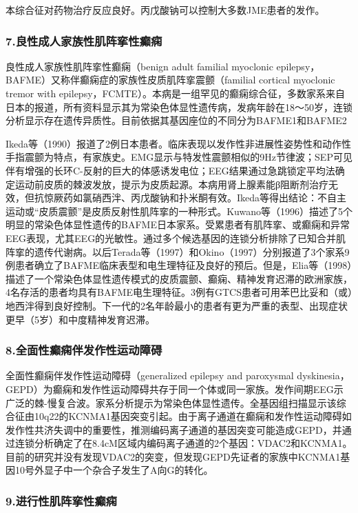 本综合征对药物治疗反应良好。丙戊酸钠可以控制大多数JME患者的发作。

\subsubsection{7.良性成人家族性肌阵挛性癫痫}

良性成人家族性肌阵挛性癫痫（benign adult familial myoclonic
epilepsy，BAFME）又称伴癫痫症的家族性皮质肌阵挛震颤（familial cortical
myoclonic tremor with
epilepsy，FCMTE）。本病是一组罕见的癫痫综合征，多数家系来自日本的报道，所有资料显示其为常染色体显性遗传病，发病年龄在18～50岁，连锁分析显示存在遗传异质性。目前依据其基因座位的不同分为BAFME1和BAFME2

Ikeda等（1990）报道了2例日本患者。临床表现以发作性非进展性姿势性和动作性手指震颤为特点，有家族史。EMG显示与特发性震颤相似的9Hz节律波；SEP可见伴有增强的长环C-反射的巨大的体感诱发电位；EEG结果通过急跳锁定平均法确定运动前皮质的棘波发放，提示为皮质起源。本病用肾上腺素能β阻断剂治疗无效，但抗惊厥药如氯硝西泮、丙戊酸钠和扑米酮有效。Ikeda等得出结论：不自主运动或“皮质震颤”是皮质反射性肌阵挛的一种形式。Kuwano等（1996）描述了5个明显的常染色体显性遗传的BAFME日本家系。受累患者有肌阵挛、或癫痫和异常EEG表现，尤其EEG的光敏性。通过多个候选基因的连锁分析排除了已知合并肌阵挛的遗传代谢病。以后Terada等（1997）和Okino（1997）分别报道了3个家系9例患者确立了BAFME临床表型和电生理特征及良好的预后。但是，Elia等（1998）描述了一个常染色体显性遗传模式的皮质震颤、癫痫、精神发育迟滞的欧洲家族，4名存活的患者均具有BAFME电生理特征。3例有GTCS患者可用苯巴比妥和（或）地西泮得到良好控制。下一代的2名年龄最小的患者有更为严重的表型、出现症状更早（5岁）和中度精神发育迟滞。

\subsubsection{8.全面性癫痫伴发作性运动障碍}

全面性癫痫伴发作性运动障碍（generalized epilepsy and paroxysmal
dyskinesia，GEPD）为癫痫和发作性运动障碍共存于同一个体或同一家族。发作间期EEG示广泛的棘-慢复合波。家系分析提示为常染色体显性遗传。全基因组扫描显示该综合征由10q22的KCNMA1基因突变引起。由于离子通道在癫痫和发作性运动障碍如发作性共济失调中的重要性，推测编码离子通道的基因突变可能造成GEPD，并通过连锁分析确定了在8.4cM区域内编码离子通道的2个基因：VDAC2和KCNMA1。目前的研究并没有发现VDAC2的突变，但发现GEPD先证者的家族中KCNMA1基因10号外显子中一个杂合子发生了A向G的转化。

\subsubsection{9.进行性肌阵挛性癫痫}

